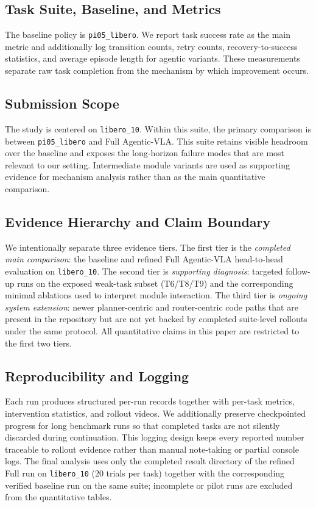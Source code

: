 \documentclass[a4paper]{Template/LaTeX_Templates/waica}
\begin{document}
\subsection{Task Suite, Baseline, and Metrics}

The baseline policy is \texttt{pi05\_libero}. We report task success rate as the main metric and additionally log transition counts, retry counts, recovery-to-success statistics, and average episode length for agentic variants. These measurements separate raw task completion from the mechanism by which improvement occurs.

\subsection{Submission Scope}
The study is centered on \texttt{libero\_10}. Within this suite, the primary comparison is between \texttt{pi05\_libero} and Full Agentic-VLA. This suite retains visible headroom over the baseline and exposes the long-horizon failure modes that are most relevant to our setting. Intermediate module variants are used as supporting evidence for mechanism analysis rather than as the main quantitative comparison.

\subsection{Evidence Hierarchy and Claim Boundary}

We intentionally separate three evidence tiers. The first tier is the \emph{completed main comparison}: the baseline and refined Full Agentic-VLA head-to-head evaluation on \texttt{libero\_10}. The second tier is \emph{supporting diagnosis}: targeted follow-up runs on the exposed weak-task subset (T6/T8/T9) and the corresponding minimal ablations used to interpret module interaction. The third tier is \emph{ongoing system extension}: newer planner-centric and router-centric code paths that are present in the repository but are not yet backed by completed suite-level rollouts under the same protocol. All quantitative claims in this paper are restricted to the first two tiers.

\subsection{Reproducibility and Logging}

Each run produces structured per-run records together with per-task metrics, intervention statistics, and rollout videos. We additionally preserve checkpointed progress for long benchmark runs so that completed tasks are not silently discarded during continuation. This logging design keeps every reported number traceable to rollout evidence rather than manual note-taking or partial console logs. The final analysis uses only the completed result directory of the refined Full run on \texttt{libero\_10} (20 trials per task) together with the corresponding verified baseline run on the same suite; incomplete or pilot runs are excluded from the quantitative tables.
\end{document}
